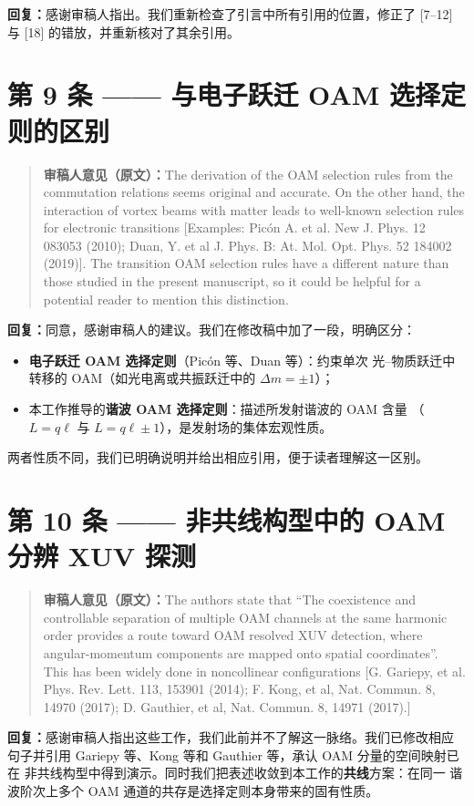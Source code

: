 \documentclass[11pt,a4paper]{ctexart}
\newcommand{\reviewer}[1]{\par\medskip\begin{quote}\small\color{gray!70!black}%
  \textbf{审稿人意见（原文）：}#1\end{quote}\medskip}
\newcommand{\response}{\par\medskip\textbf{回复：}}
\begin{document}
\response 感谢审稿人指出。我们重新检查了引言中所有引用的位置，修正了
[7--12] 与 [18] 的错放，并重新核对了其余引用。

\section*{第 9 条 —— 与电子跃迁 OAM 选择定则的区别}

\reviewer{The derivation of the OAM selection rules from the commutation relations
seems original and accurate. On the other hand, the interaction of vortex beams
with matter leads to well-known selection rules for electronic transitions
[Examples: Pic\'on A. et al. New J. Phys. 12 083053 (2010); Duan, Y. et al
J. Phys. B: At. Mol. Opt. Phys. 52 184002 (2019)]. The transition OAM selection
rules have a different nature than those studied in the present manuscript, so it
could be helpful for a potential reader to mention this distinction.}

\response 同意，感谢审稿人的建议。我们在修改稿中加了一段，明确区分：

\begin{itemize}
  \item \textbf{电子跃迁 OAM 选择定则}（Pic\'on 等、Duan 等）：约束单次
  光--物质跃迁中转移的 OAM（如光电离或共振跃迁中的 $\Delta m=\pm1$）；
  \item 本工作推导的\textbf{谐波 OAM 选择定则}：描述所发射谐波的 OAM 含量
  （$L=q\ell$ 与 $L=q\ell\pm1$），是发射场的集体宏观性质。
\end{itemize}

两者性质不同，我们已明确说明并给出相应引用，便于读者理解这一区别。

\section*{第 10 条 —— 非共线构型中的 OAM 分辨 XUV 探测}

\reviewer{The authors state that ``The coexistence and controllable separation of
multiple OAM channels at the same harmonic order provides a route toward OAM
resolved XUV detection, where angular-momentum components are mapped onto spatial
coordinates''. This has been widely done in noncollinear configurations
[G. Gariepy, et al. Phys. Rev. Lett. 113, 153901 (2014); F. Kong, et al,
Nat. Commun. 8, 14970 (2017); D. Gauthier, et al, Nat. Commun. 8, 14971 (2017).]}

\response 感谢审稿人指出这些工作，我们此前并不了解这一脉络。我们已修改相应
句子并引用 Gariepy 等、Kong 等和 Gauthier 等，承认 OAM 分量的空间映射已在
非共线构型中得到演示。同时我们把表述收敛到本工作的\textbf{共线}方案：在同一
谐波阶次上多个 OAM 通道的共存是选择定则本身带来的固有性质。
\end{document}
